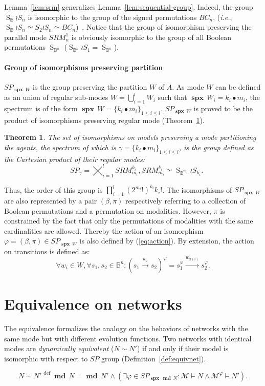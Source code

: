 \documentclass[12pt]{elsarticle}
\newtheorem{theorem}{Theorem}
\newcommand{\Bset}[0]{\mathbb{B}}
\newcommand{\eqdef}[0]{\stackrel{\scriptscriptstyle{\mathrm{def}}}{=}}
\newcommand{\abbrev}[1]{#1, \relax}
\newcommand{\ie}[0]{\abbrev{\textit{i.e.}}}
\newcommand{\evo}[0]{\longrightarrow}
\newcommand{\xevo}[1]{\stackrel{#1}{\evo}}
\newcommand{\spectrum}[0]{{\operatorname{\textbf{spx}}\,}}
\newcommand{\mode}[0]{\operatorname{\textbf{md}} \,}
\newcommand{\gsym}[1]{\operatorname{S}_{#1}}
\begin{document}
 Lemma~\ref{lem:srm} generalizes Lemma~\ref{lem:sequential-group}. Indeed, the group $\gsym{\Bset} \wr S_{n} $ is isomorphic to the group of the signed permutations $BC_n$, (\ie $\gsym{\Bset} \wr S_n \simeq S_{2} \wr S_n \simeq BC_n$)~\cite{Harary2000}.
Notice that the group of isomorphism preserving the parallel mode $SRM^1_n$ is obviously isomorphic to the group of all Boolean permutations $\gsym{\Bset^n}$ ($\gsym{\Bset^n} \wr S_1 = \gsym{\Bset^n}$).

\paragraph{Group of isomorphisms preserving partition}  $SP_{\spectrum W}$  is the group preserving the partition $W$ of $A$. As mode $W$ can be defined as an union of regular sub-modes $W=\bigcup_{i=1}^l W_i$ such that $\spectrum W_i = k_i \bullet m_i$,  the spectrum is of the form $\spectrum W = \{ k_i \bullet m_i \}_{1 \leq i \leq l}$.  $SP_{\spectrum W}$ is proved to be the product of isomorphisms preserving regular mode (Theorem~\ref{the:sm}). 
\begin{theorem} 
\label{the:sm}
The set of isomorphisms on models preserving a mode partitioning the agents, the spectrum of which is $ \gamma= \{k_i \bullet m_i\}_{1 \leq i \leq l}$, is the group defined as the Cartesian product of their regular modes:
$$\quad SP_\gamma = \bigtimes_{i=1}^l SRM^{k_i}_{m_i}, SRM^{k_i}_{m_i} \simeq \gsym{\Bset^{m_i}} \wr S_{k_i}.$$
\end{theorem}
Thus, the order of this group is $\prod_{i=1}^l\left(2^{m_i}!\right)^{k_i} k_i!$.
The isomorphisms of  $SP_{\spectrum W}$ are also represented by a pair $(\beta,\pi)$ respectively referring to a collection of Boolean permutations and a permutation on modalities. However, $\pi$ is constrained by the fact that only the permutations of modalities with the same cardinalities are allowed. Thereby the action of an isomorphism $\varphi=(\beta,\pi) \in SP_{\spectrum W}$ is also defined by (\ref{eq:action}). By extension, the  action on transitions  is defined as:
\begin{equation}
\label{eq:equiv-iso}
\forall w_i \in W, \forall s_1,s_2 \in \Bset^n:(s_1 \xevo{w_i} s_2)^\varphi= s_1^\varphi \xevo{w_{\pi(i)}} s_2^\varphi.
\end{equation}






\section{Equivalence on networks}
\label{sec:evo-fun}
The equivalence formalizes the analogy on the behaviors of networks with the same mode but with different evolution functions.  Two networks with identical modes are \emph{dynamically equivalent} ($N \sim N'$) if and only if their model is isomorphic with respect to $SP$ group (Definition~\ref{def:equivnet}).
\begin{definition}
\label{def:equivnet}
$$N \sim N' \eqdef \mode N=\mode N' \wedge (\exists \varphi \in SP_{\spectrum \mode N}: \mathcal M \models N 
\wedge \mathcal M^\varphi  \models N').$$
\end{definition}
\end{document}

